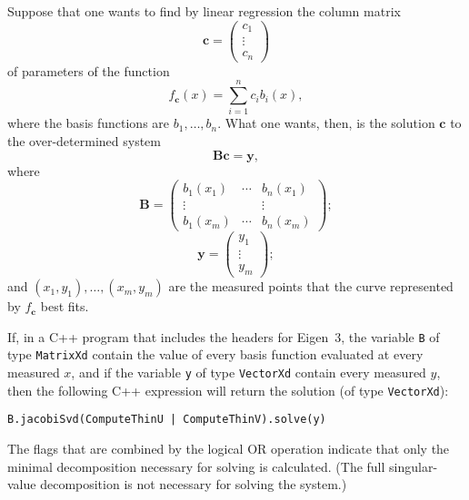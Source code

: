 \documentclass[twocolumn]{article}
\begin{document}
Suppose that one wants to find by linear regression the column matrix
\begin{equation}
   \mathbf{c} =
   \begin{pmatrix}
      c_1\\
      \vdots\\
      c_n
   \end{pmatrix}
\end{equation}
of parameters of the function
\begin{equation}
   f_{\mathbf{c}}(x) = \sum_{i=1}^{n} c_i b_i(x),
\end{equation}
where the basis functions are $b_1, \ldots, b_n$. What one wants, then, is the
solution $\mathbf{c}$ to the over-determined system
\begin{equation}
   \mathbf{B} \mathbf{c} = \mathbf{y},
\end{equation}
where
\begin{equation}
   \mathbf{B} =
   \begin{pmatrix}
      b_1(x_1) & \cdots & b_n(x_1)\\
      \vdots   &        & \vdots\\
      b_1(x_m) & \cdots & b_n(x_m)
   \end{pmatrix};
\end{equation}
\begin{equation}
   \mathbf{y} =
   \begin{pmatrix}
      y_1\\
      \vdots\\
      y_m
   \end{pmatrix};
\end{equation}
and $(x_1,y_1), \ldots, (x_m,y_m)$ are the measured points that the curve
represented by $f_{\mathbf{c}}$ best fits.

If, in a C++ program that includes the headers for Eigen~3, the variable
\texttt{B} of type \texttt{MatrixXd} contain the value of every basis function
evaluated at every measured $x$, and if the variable \texttt{y} of type
\texttt{VectorXd} contain every measured $y$, then the following C++ expression
will return the solution (of type \texttt{VectorXd}):
\begin{small}
\begin{verbatim}
B.jacobiSvd(ComputeThinU | ComputeThinV).solve(y)
\end{verbatim}
\end{small}
The flags that are combined by the logical OR operation indicate that only the
minimal decomposition necessary for solving is calculated. (The full
singular-value decomposition is not necessary for solving the system.)

%
%
%
%

\newpage


\end{document}
